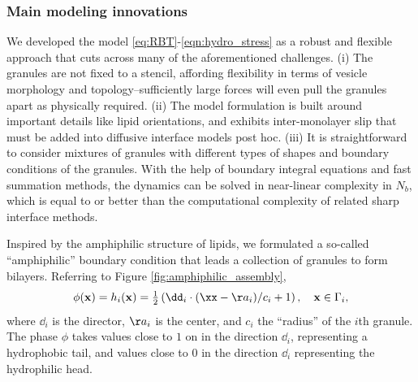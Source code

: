 \subsubsection{Main modeling innovations}
We developed the model \eqref{eq:RBT}-\eqref{eqn:hydro_stress} 
as a robust and flexible approach
that cuts across many of the aforementioned challenges.
(i) The granules are not fixed to a stencil, 
affording flexibility in terms of vesicle morphology and topology--sufficiently
large forces will even pull the granules apart as physically required.
(ii) The model formulation is built around important details like lipid orientations,
and exhibits inter-monolayer slip that must be added into diffusive interface models
post hoc. 
(iii) It is straightforward to consider mixtures of granules with different
types of shapes and boundary conditions of the granules.
With the help of boundary integral equations
and fast summation methods, the dynamics can be solved in 
near-linear complexity in $N_b$, which is equal to or better than 
the computational complexity of related sharp interface methods. 

Inspired
by the amphiphilic structure of lipids,
we formulated a so-called
``amphiphilic'' boundary condition
that leads a collection of granules to form bilayers.
Referring to Figure \ref{fig:amphiphilic_assembly}, 
\begin{equation}
\label{eq:amphiphilic_BC}
\phi(\mathbf{x}) = h_i(\mathbf{x}) = \tfrac{1}{2}\left(\dd_i \cdot (\xx - \aa_i)/c_i + 1\right), \quad
\mathbf{x} \in \Gamma_i,
\end{equation}
where $\dd_i$ is the director, $\aa_i$ is the center, and $c_i$ the
``radius'' of the $i$th granule.  
The phase $\phi$ takes values close to $1$ on in the direction $\dd_i$,
representing a hydrophobic tail, and values close to $0$ 
in the direction $\dd_i$ representing the hydrophilic head.

